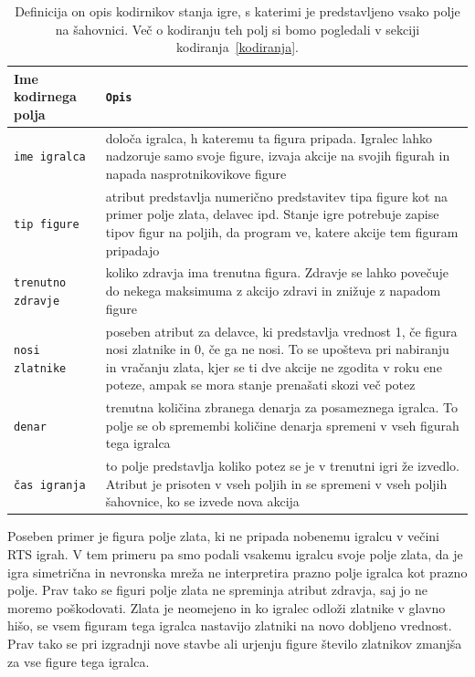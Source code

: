 \documentclass[a4paper, 12pt]{book}
\begin{document}
\begin{table}
	\begin{center}
		\begin{tabular}{p{0.2\linewidth}|p{0.8\linewidth}}
			Ime kodirnega polja    & {\tt Opis} \\ \hline
			{\tt ime igralca}      & določa igralca, h kateremu ta figura pripada. 
									 Igralec lahko nadzoruje samo svoje figure, izvaja akcije na svojih figurah in napada nasprotnikovikove figure \\
			{\tt tip figure}       & atribut predstavlja numerično predstavitev tipa figure kot na primer polje zlata, delavec ipd.
									 Stanje igre potrebuje zapise tipov figur na poljih, da program ve, katere akcije tem figuram pripadajo\\
			{\tt trenutno zdravje} & koliko zdravja ima trenutna figura. 
									 Zdravje se lahko povečuje do nekega maksimuma z akcijo zdravi in znižuje z napadom figure \\
			{\tt nosi zlatnike}    & poseben atribut za delavce, ki predstavlja vrednost 1, če figura nosi zlatnike in 0, če ga ne nosi. 
									 To se upošteva pri nabiranju in vračanju zlata, kjer se ti dve akcije ne zgodita v roku ene poteze, ampak se mora stanje prenašati skozi več potez \\
			{\tt denar}            & trenutna količina zbranega denarja za posameznega igralca. 
									 To polje se ob spremembi količine denarja spremeni v vseh figurah tega igralca \\
			{\tt čas igranja}      & to polje predstavlja koliko potez se je v trenutni igri že izvedlo. 
									 Atribut je prisoten v vseh poljih in se spremeni v vseh poljih šahovnice, ko se izvede nova akcija \\
		\end{tabular}
	\end{center}
	\caption{Definicija on opis kodirnikov stanja igre, s katerimi je predstavljeno vsako polje na šahovnici. Več o kodiranju teh polj si bomo pogledali v sekciji kodiranja~\ref{kodiranja}.}
	\label{tableEncoders}
\end{table}

Poseben primer je figura polje zlata, ki ne pripada nobenemu igralcu v večini RTS igrah. 
V tem primeru pa smo podali vsakemu igralcu svoje polje zlata, da je igra simetrična in nevronska mreža ne interpretira prazno polje igralca kot prazno polje.
Prav tako se figuri polje zlata ne spreminja atribut zdravja, saj jo ne moremo poškodovati. 
Zlata je neomejeno in ko igralec odloži zlatnike v glavno hišo, se vsem figuram tega igralca nastavijo zlatniki na novo dobljeno vrednost. 
Prav tako se pri izgradnji nove stavbe ali urjenju figure število zlatnikov zmanjša za vse figure tega igralca.
\end{document}
